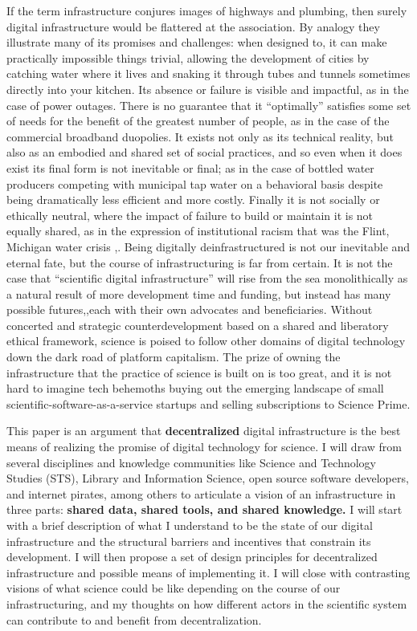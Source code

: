 \documentclass{article}
\begin{document}
If the term infrastructure conjures images of highways and plumbing,
then surely digital infrastructure would be flattered at the
association. By analogy they illustrate many of its promises and
challenges: when designed to, it can make practically impossible things
trivial, allowing the development of cities by catching water where it
lives and snaking it through tubes and tunnels sometimes directly into
your kitchen. Its absence or failure is visible and impactful, as in the
case of power outages. There is no guarantee that it ``optimally''
satisfies some set of needs for the benefit of the greatest number of
people, as in the case of the commercial broadband duopolies. It exists
not only as its technical reality, but also as an embodied and shared
set of social practices, and so even when it does exist its final form
is not inevitable or final; as in the case of bottled water producers
competing with municipal tap water on a behavioral basis despite being
dramatically less efficient and more costly. Finally it is not socially
or ethically neutral, where the impact of failure to build or maintain
it is not equally shared, as in the expression of institutional racism
that was the Flint, Michigan water crisis \cite{michicancivilrightscommissionFlintWaterCrisis2017},.
Being digitally deinfrastructured is not our inevitable and eternal
fate, but the course of infrastructuring is far from certain. It is not
the case that ``scientific digital infrastructure'' will rise from the
sea monolithically as a natural result of more development time and
funding, but instead has many possible futures\cite{mirowskiFutureOpenScience2018},,each with their own advocates and
beneficiaries. Without concerted and strategic counterdevelopment based
on a shared and liberatory ethical framework, science is poised to
follow other domains of digital technology down the dark road of
platform capitalism. The prize of owning the infrastructure that the
practice of science is built on is too great, and it is not hard to
imagine tech behemoths buying out the emerging landscape of small
scientific-software-as-a-service startups and selling subscriptions to
Science Prime.

This paper is an argument that \textbf{decentralized} digital
infrastructure is the best means of realizing the promise of digital
technology for science. I will draw from several disciplines and
knowledge communities like Science and Technology Studies (STS), Library
and Information Science, open source software developers, and internet
pirates, among others to articulate a vision of an infrastructure in
three parts: \textbf{shared data, shared tools, and shared knowledge.} I
will start with a brief description of what I understand to be the state
of our digital infrastructure and the structural barriers and incentives
that constrain its development. I will then propose a set of design
principles for decentralized infrastructure and possible means of
implementing it. I will close with contrasting visions of what science
could be like depending on the course of our infrastructuring, and my
thoughts on how different actors in the scientific system can contribute
to and benefit from decentralization.
\end{document}
